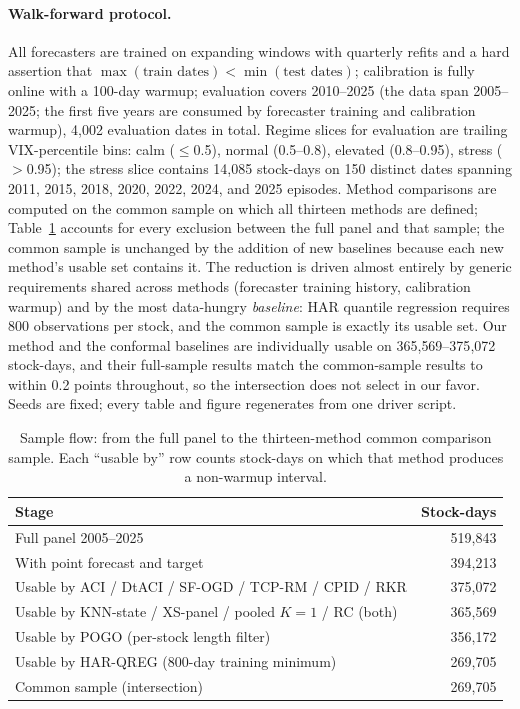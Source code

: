 \paragraph{Walk-forward protocol.} All forecasters are trained on
expanding windows with quarterly refits and a hard assertion that
$\max(\text{train dates}) < \min(\text{test dates})$; calibration is fully
online with a 100-day warmup; evaluation covers 2010--2025 (the data
span 2005--2025; the first five years are consumed by forecaster
training and calibration warmup), 4{,}002 evaluation dates in total.
Regime slices for evaluation are trailing VIX-percentile bins: calm
($\le$0.5), normal (0.5--0.8), elevated (0.8--0.95), stress ($>$0.95);
the stress slice contains 14{,}085 stock-days on 150 distinct dates
spanning 2011, 2015, 2018, 2020, 2022, 2024, and 2025 episodes. Method comparisons are computed on the common sample on
which all thirteen methods are defined; Table~\ref{tab:flow} accounts for
every exclusion between the full panel and that sample; the common
sample is unchanged by the addition of new baselines because each new
method's usable set contains it. The reduction is
driven almost entirely by generic requirements shared across methods
(forecaster training history, calibration warmup) and by the most
data-hungry \emph{baseline}: HAR quantile regression requires 800
observations per stock, and the common sample is exactly its usable set.
Our method and the conformal baselines are individually usable on
365{,}569--375{,}072 stock-days, and their full-sample results match the
common-sample results to within 0.2 points throughout, so the
intersection does not select in our favor. Seeds are fixed; every table
and figure regenerates from one driver script.

\begin{table}[t]
\centering
\caption{Sample flow: from the full panel to the thirteen-method
common comparison sample. Each ``usable by'' row counts stock-days on
which that method produces a non-warmup interval.}
\label{tab:flow}
\small
\begin{tabular}{lr}
\toprule
Stage & Stock-days \\
\midrule
Full panel 2005--2025 & 519{,}843 \\
With point forecast and target & 394{,}213 \\
Usable by ACI / DtACI / SF-OGD / TCP-RM / CPID / RKR & 375{,}072 \\
Usable by KNN-state / XS-panel / pooled $K=1$ / RC (both) & 365{,}569 \\
Usable by POGO (per-stock length filter) & 356{,}172 \\
Usable by HAR-QREG (800-day training minimum) & 269{,}705 \\
Common sample (intersection) & 269{,}705 \\
\bottomrule
\end{tabular}
\end{table}
